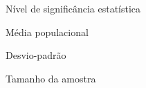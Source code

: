 
%


\item[$ \alpha $] Nível de significância estatística
\item[$ \mu $] Média populacional
\item[$ \sigma $] Desvio-padrão
\item[$ n $] Tamanho da amostra
